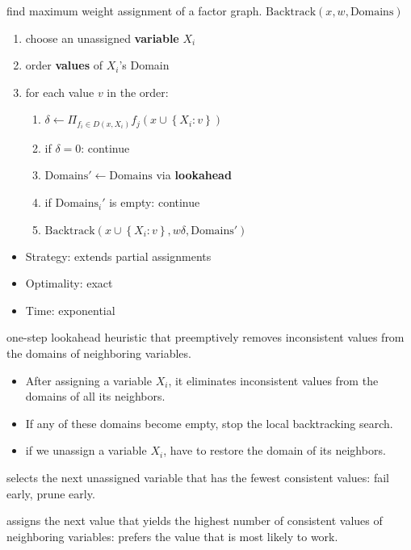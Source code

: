  find maximum weight assignment of a factor graph.
\textbf{$\text{Backtrack}(x, w, \text{Domains})$}
\begin{enumerate}
    \item choose an unassigned \textbf{variable} $X_i$ 
    \item order \textbf{values} of $X_i$'s Domain 
    \item for each value $v$ in the order:\begin{enumerate}
        \item $\delta \leftarrow \Pi_{f_i\in D(x,X_i)}f_j(x\cup\left\{X_i:v\right\})$
        \item if $\delta = 0$: continue
        \item $\text{Domains}' \leftarrow \text{Domains}$ via \textbf{lookahead} 
        \item if $\text{Domains}_i'$ is empty: continue
        \item \textbf{$\text{Backtrack}(x \cup \left\{X_i:v\right\}, w\delta, \text{Domains}')$}
    \end{enumerate}
\end{enumerate}
\begin{itemize}
    \item Strategy: extends partial assignments
    \item Optimality: exact
    \item Time: exponential
\end{itemize}

 one-step lookahead heuristic that preemptively removes
inconsistent values from the domains of neighboring variables.
\begin{itemize}
    \item After assigning a variable $X_i$, it eliminates inconsistent values from the domains of all its neighbors.
    \item If any of these domains become empty, stop the local backtracking search.
    \item if we unassign a variable $X_i$, have to restore the domain of its neighbors.
\end{itemize}

 selects the next unassigned
variable that has the fewest consistent values: fail early, prune early.

 assigns the next value that yields
the highest number of consistent values of neighboring variables: prefers the
value that is most likely to work.

